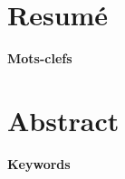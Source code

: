 \thispagestyle{empty}
\begin{center}
\Large
\textbf{\doctitlefr}
\end{center}
\section*{Resumé}

\begin{minipage}{0.15\textwidth}
\textbf{Mots-clefs}
\end{minipage}
\hfill
\begin{minipage}{0.8\textwidth}
     \dockeywordsfr
\end{minipage}

\hrulefill
\begin{center}
\Large
\textbf{\doctitleeng}
\end{center}
\section*{Abstract}

\begin{minipage}{0.15\textwidth}
 \textbf{Keywords}
\end{minipage}
\hfill
\begin{minipage}{0.8\textwidth}
    \dockeywordseng
\end{minipage}
